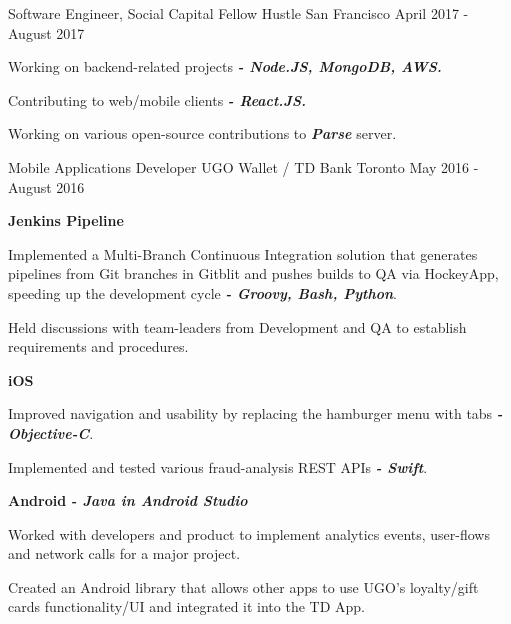 \begin{cventries}
	\cventry
	{Software Engineer, Social Capital Fellow}
	{Hustle}
	{San Francisco}
	{April 2017 - August 2017}
	{
		\begin{cvitems}
			\item {Working on backend-related projects \textbf{\textit{ - Node.JS, MongoDB, AWS.}}}
			\item {Contributing to web/mobile clients \textbf{\textit{  - React.JS.}}}
			\item {Working on various open-source contributions to \textbf{\textit{Parse}} server.}
		\end{cvitems}
	}
  \cventry
    {Mobile Applications Developer}
    {UGO Wallet / TD Bank}
    {Toronto}
    {May 2016 - August 2016}
    {
      \begin{cvitems}
        \item[]{\vspace{0.08cm}\textbf {Jenkins Pipeline}}
        \item {\vspace{0.08cm}Implemented a Multi-Branch Continuous Integration solution that generates pipelines from Git branches in Gitblit and pushes builds to QA via HockeyApp, speeding up the development cycle \textbf{\textit{ - Groovy, Bash, Python}}.}
        \item {Held discussions with team-leaders from Development and QA to establish requirements and procedures.\vspace{0.08cm}}
        \item[]{\textbf {iOS}}
        \item {\vspace{0.08cm}Improved navigation and usability by replacing the hamburger menu with tabs \textit{\textbf{ - Objective-C}}.}
        \item {Implemented and tested various fraud-analysis REST APIs \textit{\textbf{ - Swift}}.\vspace{0.08cm}}
        \item[]{\textbf {Android} \textit{\textbf { - Java in Android Studio}}}
        \item {\vspace{0.08cm}Worked with developers and product to implement analytics events, user-flows and network calls for a major project.\vspace{0.00cm}}
        \item {Created an Android library that allows other apps to use UGO's loyalty/gift cards functionality/UI and integrated it into the TD App.}

\end{cvitems}}
\end{cventries}

